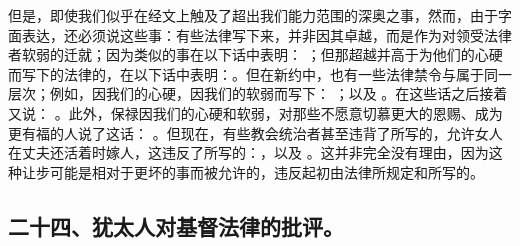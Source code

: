 但是，即使我们似乎在经文上触及了超出我们能力范围的深奥之事，然而，由于字面表达，还必须说这些事：有些法律写下来，并非因其卓越，而是作为对领受法律者软弱的迁就；因为类似的事在以下话中表明： ；但那超越并高于为他们的心硬而写下的法律的，在以下话中表明：。但在新约中，也有一些法律禁令与属于同一层次；例如，因我们的心硬，因我们的软弱而写下： ；以及 。在这些话之后接着又说： 。此外，保禄因我们的心硬和软弱，对那些不愿意切慕更大的恩赐、成为更有福的人说了这话：  。但现在，有些教会统治者甚至违背了所写的，允许女人在丈夫还活着时嫁人，这违反了所写的：，以及 。这并非完全没有理由，因为这种让步可能是相对于更坏的事而被允许的，违反起初由法律所规定和所写的。\par


\subsection{二十四、犹太人对基督法律的批评。}


